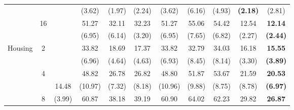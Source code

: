 \documentclass[letterpaper]{article} %
\begin{document}
\begin{table}[!t]
{\begin{tabular}{clcccccccc|cc}
\multicolumn{2}{c}{}                             &                       &                             & (3.62)                    & (1.97)                    & (2.24)                      & (3.62)                    & (6.16)                    & (4.93)                      & \textbf{(2.18)}     & (2.81)                \\
\multicolumn{2}{c}{}                             & \multirow{2}{*}{16}   &                             & 51.27                     & 32.11                     & 32.23                       & 51.27                     & 55.06                     & 54.42                       & 12.54               & \textbf{12.14}        \\
\multicolumn{2}{c}{}                             &                       &                             & (6.95)                    & (6.14)                    & (3.20)                      & (6.95)                    & (7.65)                    & (6.82)                      & (2.27)              & \textbf{(2.44)}       \\ \hline
\multicolumn{2}{c}{\multirow{8}{*}{Housing}}     & \multirow{2}{*}{2}    &                             & 33.82                     & 18.69                     & 17.37                       & 33.82                     & 32.79                     & 34.03                       & 16.18               & \textbf{15.55}        \\
\multicolumn{2}{c}{}                             &                       &                             & (6.96)                    & (4.64)                    & (4.63)                      & (6.93)                    & (8.45)                    & (8.14)                      & (3.30)              & \textbf{(3.89)}       \\
\multicolumn{2}{c}{}                             & \multirow{2}{*}{4}    &                             & 48.82                     & 26.78                     & 26.82                       & 48.80                     & 51.87                     & 53.67                       & 21.59               & \textbf{20.53}        \\
\multicolumn{2}{c}{}                             &                       & 14.48                       & (10.97)                   & (7.32)                    & (8.18)                      & (10.96)                   & (9.88)                    & (8.75)                      & (8.78)              & \textbf{(6.97)}       \\
\multicolumn{2}{c}{}                             & \multirow{2}{*}{8}    & (3.99)                      & 60.87                     & 38.18                     & 39.19                       & 60.90                     & 64.02                     & 62.23                       & 29.82               & \textbf{26.87}        \\

\end{tabular}}
\end{table}
\end{document}
